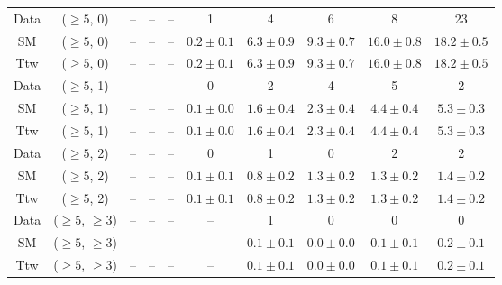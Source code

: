 \begin{table}[h!]
{\begin{tabular}{cccccccccc}
	Data & ($\ge5$, 0) & -- & -- & -- & 1 & 4 & 6 & 8 & 23 \\[0.5ex] 
	SM & ($\ge5$, 0) & -- & -- & -- & $0.2\pm 0.1$ & $6.3\pm 0.9$ & $9.3\pm 0.7$ & $16.0\pm 0.8$ & $18.2\pm 0.5$ \\[0.5ex] 
	Ttw & ($\ge5$, 0) & -- & -- & -- & $0.2\pm 0.1$ & $6.3\pm 0.9$ & $9.3\pm 0.7$ & $16.0\pm 0.8$ & $18.2\pm 0.5$ \\[0.5ex] 
	Data & ($\ge5$, 1) & -- & -- & -- & 0 & 2 & 4 & 5 & 2 \\[0.5ex] 
	SM & ($\ge5$, 1) & -- & -- & -- & $0.1\pm 0.0$ & $1.6\pm 0.4$ & $2.3\pm 0.4$ & $4.4\pm 0.4$ & $5.3\pm 0.3$ \\[0.5ex] 
	Ttw & ($\ge5$, 1) & -- & -- & -- & $0.1\pm 0.0$ & $1.6\pm 0.4$ & $2.3\pm 0.4$ & $4.4\pm 0.4$ & $5.3\pm 0.3$ \\[0.5ex] 
	Data & ($\ge5$, 2) & -- & -- & -- & 0 & 1 & 0 & 2 & 2 \\[0.5ex] 
	SM & ($\ge5$, 2) & -- & -- & -- & $0.1\pm 0.1$ & $0.8\pm 0.2$ & $1.3\pm 0.2$ & $1.3\pm 0.2$ & $1.4\pm 0.2$ \\[0.5ex] 
	Ttw & ($\ge5$, 2) & -- & -- & -- & $0.1\pm 0.1$ & $0.8\pm 0.2$ & $1.3\pm 0.2$ & $1.3\pm 0.2$ & $1.4\pm 0.2$ \\[0.5ex] 
	Data & ($\ge5$, $\ge3$) & -- & -- & -- & -- & 1 & 0 & 0 & 0 \\[0.5ex] 
	SM & ($\ge5$, $\ge3$) & -- & -- & -- & -- & $0.1\pm 0.1$ & $0.0\pm 0.0$ & $0.1\pm 0.1$ & $0.2\pm 0.1$ \\[0.5ex] 
	Ttw & ($\ge5$, $\ge3$) & -- & -- & -- & -- & $0.1\pm 0.1$ & $0.0\pm 0.0$ & $0.1\pm 0.1$ & $0.2\pm 0.1$ \\[0.5ex] 
	\hline
	\hline
\end{tabular}}
\end{table}
